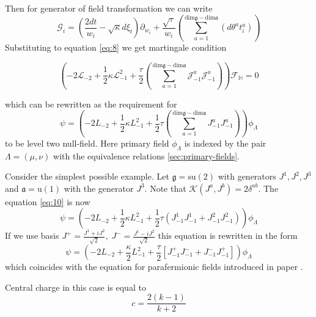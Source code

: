 \documentclass[12pt]{article}
\theoremstyle{definition}
\newcommand{\gf}{\mathfrak{g}}
\newcommand{\af}{\mathfrak{a}}
\theoremstyle{definition} \newtheorem{Def}{Definition}
\begin{document}
Then for generator of field transformation we can write 
\begin{equation}
  \mathcal{G}_{i}=\left(\frac{2dt}{w_{i}}-\sqrt{\kappa} d\xi_{t}\right) \partial_{w_{i}}+\frac{\sqrt{\tau}}{w_{i}}\left(\sum_{a=1}^{\mathrm{dim}\gf-\mathrm{dim}\af}\left(d \theta ^{a} t^{a}_{i}\right)\right)
\label{eq:5}
\end{equation}
Substituting to equation \eqref{eq:8} we get martingale condition

\begin{equation}
  \left(-2 \mathcal{L}_{-2}+\frac{1}{2}\kappa \mathcal{L}_{-1}^{2}+\frac{\tau}{2}\left( \sum_{a=1}^{\mathrm{dim}\gf-\mathrm{dim}\af} \mathcal{J}^{a}_{-1} \mathcal{J}^{a}_{-1}\right)\right)        \mathcal{F}_{\mathbb{H}}=0
\label{eq:9}
\end{equation}

which can be rewritten as the requirement for
\begin{equation}
  \psi=\left(-2L_{-2}+\frac{1}{2}\kappa L_{-1}^{2}+\frac{1}{2}\tau \left(\sum_{a=1}^{\mathrm{dim}\gf-\mathrm{dim}\af}J^{a}_{-1}J^{a}_{-1}\right)\right) \phi_{\Lambda}
\label{eq:10}
\end{equation}
to be level two null-field. Here primary field $\phi_{\Lambda}$ is indexed by the pair $\Lambda=(\mu,\nu)$ with the equivalence relations \ref{sec:primary-fields}.

Consider the simplest possible example. Let $\gf=\mathrm{su}(2)$ with generators $J^{1},J^{2},J^{3}$ and $\af=\mathrm{u}(1)$ with the generator $J^{3}$. Note that $\mathcal{K}(J^{a},J^{b})=2\delta^{ab}$. The equation \eqref{eq:10} is now
\begin{equation}
  \label{eq:11}
  \psi=\left(-2L_{-2}+\frac{1}{2}\kappa L_{-1}^{2}+\frac{1}{2}\tau \left(J^{1}_{-1}J^{1}_{-1}+J^{2}_{-1}J^{2}_{-1}\right)\right) \phi_{\Lambda}
\end{equation}
If we use basis $J^{+}=\frac{J^{1}+iJ^{2}}{\sqrt{2}},\; J^{-}=\frac{J^{1}-iJ^{2}}{\sqrt{2}}$ this equation is rewritten in the form
\begin{equation}
 \psi= \left(-2 L_{-2}+\frac{\kappa}{2}L_{-1}^{2}+\frac{\tau}{2}\left[J^{+}_{-1}J^{-}_{-1}+J^{-}_{-1}J^{+}_{-1}\right]\right) \phi_{\Lambda}
\label{eq:12}
\end{equation}
which coincides with the equation for parafermionic fields introduced in paper \cite{santachiara2008sle}.

Central charge in this case is equal to
\begin{equation}
  \label{eq:14}
  c=\frac{2(k-1)}{k+2}
\end{equation}
\end{document}
